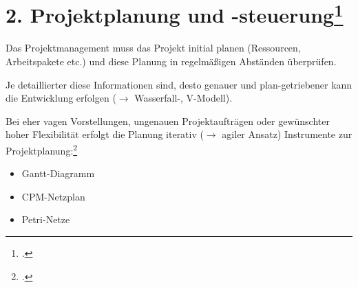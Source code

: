 \documentclass{lehramt-informatik-haupt}
\begin{document}
\section{2. Projektplanung und -steuerung\footcite[Seite 19]{sosy:fs:1}}

Das Projektmanagement muss das Projekt initial planen (Ressourcen,
Arbeitspakete etc.) und diese Planung in regelmäßigen Abständen
überprüfen.

Je detaillierter diese Informationen sind, desto genauer und
plan-getriebener kann die Entwicklung erfolgen ($\rightarrow$
Wasserfall-, V-Modell).

Bei eher vagen Vorstellungen, ungenauen Projektaufträgen oder
gewünschter hoher Flexibilität erfolgt die Planung iterativ
($\rightarrow$ agiler Ansatz) Instrumente zur
Projektplanung:\footcite[Seite 25-27]{schatten}

\begin{itemize}
\item Gantt-Diagramm
\item CPM-Netzplan
\item Petri-Netze
\end{itemize}

\literatur
\end{document}
